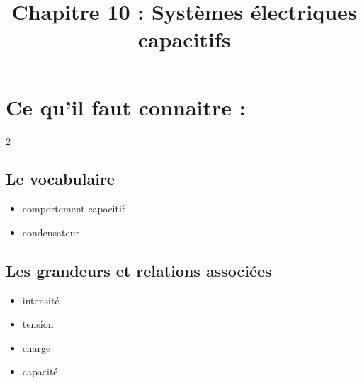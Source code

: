 \documentclass[a4paper,12pt]{article}
\title{\vspace{-1cm}\large Chapitre 10 : Systèmes électriques capacitifs}
\date{}
\begin{document}
	\maketitle
	\vspace{-2.5cm}


\section*{Ce qu'il faut connaitre :}
\begin{multicols}{2}
	\subsection*{Le vocabulaire}
	\begin{itemize}
		\item[$\square$] comportement capacitif
		\item[$\square$] condensateur
	\end{itemize}
	\columnbreak
	\subsection*{Les grandeurs et relations associées}
	\begin{itemize}
		\item[$\square$] intensité
		\item[$\square$] tension
		\item[$\square$] charge
		\item[$\square$] capacité
	\end{itemize}
\end{multicols}
	

\renewcommand{\arraystretch}{2}
\end{document}
